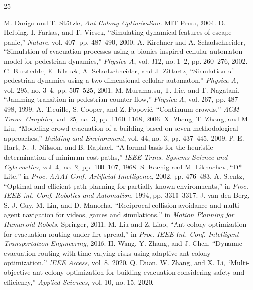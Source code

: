 ﻿\documentclass[conference]{IEEEtran}
\begin{document}
\sloppy
\raggedright
\begin{thebibliography}{25}

 M. Dorigo and T. St\"utzle, \emph{Ant Colony Optimization}. MIT Press, 2004.
 D. Helbing, I. Farkas, and T. Vicsek, ``Simulating dynamical features of escape panic,'' \emph{Nature}, vol. 407, pp. 487--490, 2000.
 A. Kirchner and A. Schadschneider, ``Simulation of evacuation processes using a bionics-inspired cellular automaton model for pedestrian dynamics,'' \emph{Physica A}, vol. 312, no. 1--2, pp. 260--276, 2002.
 C. Burstedde, K. Klauck, A. Schadschneider, and J. Zittartz, ``Simulation of pedestrian dynamics using a two-dimensional cellular automaton,'' \emph{Physica A}, vol. 295, no. 3--4, pp. 507--525, 2001.
 M. Muramatsu, T. Irie, and T. Nagatani, ``Jamming transition in pedestrian counter flow,'' \emph{Physica A}, vol. 267, pp. 487--498, 1999.
 A. Treuille, S. Cooper, and Z. Popovi\'c, ``Continuum crowds,'' \emph{ACM Trans. Graphics}, vol. 25, no. 3, pp. 1160--1168, 2006.
 X. Zheng, T. Zhong, and M. Liu, ``Modeling crowd evacuation of a building based on seven methodological approaches,'' \emph{Building and Environment}, vol. 44, no. 3, pp. 437--445, 2009.
 P. E. Hart, N. J. Nilsson, and B. Raphael, ``A formal basis for the heuristic determination of minimum cost paths,'' \emph{IEEE Trans. Systems Science and Cybernetics}, vol. 4, no. 2, pp. 100--107, 1968.
 S. Koenig and M. Likhachev, ``D* Lite,'' in \emph{Proc. AAAI Conf. Artificial Intelligence}, 2002, pp. 476--483.
 A. Stentz, ``Optimal and efficient path planning for partially-known environments,'' in \emph{Proc. IEEE Int. Conf. Robotics and Automation}, 1994, pp. 3310--3317.
 J. van den Berg, S. J. Guy, M. Lin, and D. Manocha, ``Reciprocal collision avoidance and multi-agent navigation for videos, games and simulations,'' in \emph{Motion Planning for Humanoid Robots}. Springer, 2011.
 M. Liu and Z. Liao, ``Ant colony optimization for evacuation routing under fire spread,'' in \emph{Proc. IEEE Int. Conf. Intelligent Transportation Engineering}, 2016.
 H. Wang, Y. Zhang, and J. Chen, ``Dynamic evacuation routing with time-varying risks using adaptive ant colony optimization,'' \emph{IEEE Access}, vol. 8, 2020.
 Q. Duan, W. Zhang, and X. Li, ``Multi-objective ant colony optimization for building evacuation considering safety and efficiency,'' \emph{Applied Sciences}, vol. 10, no. 15, 2020.

\end{thebibliography}
\end{document}

